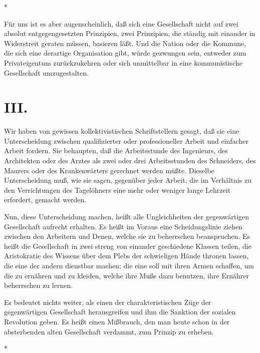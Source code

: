 \documentclass{scrbook}
\begin{document}
\begin{center}*\end{center}

Für uns ist es aber augenscheinlich, daß sich eine Gesellschaft nicht auf zwei absolut entgegengesetzten Prinzipien, zwei Prinzipien, die ständig mit einander in Widerstreit geraten müssen, basieren läßt. Und die Nation oder die Kommune, die sich eine derartige Organisation gibt, würde gezwungen sein, entweder zum Privateigentum zurückzukehren oder sich unmittelbar in eine kommunistische Gesellschaft umzugestalten.

\section*{III.}

Wir haben von gewissen kollektivistischen Schriftstellern gesagt, daß sie eine Unterscheidung zwischen qualifizierter oder professioneller Arbeit und einfacher Arbeit fordern. Sie behaupten, daß die Arbeitsstunde des Ingenieurs, des Architekten oder des Arztes als zwei oder drei Arbeitsstunden des Schneiders, des Maurers oder des Krankenwärters gerechnet werden müßte. Dieselbe Unterscheidung muß, wie sie sagen, gegenüber jeder Arbeit, die im Verhältnis zu den Verrichtungen des Tagelöhners eine mehr oder weniger lange Lehrzeit erfordert, gemacht werden.

Nun, diese Unterscheidung machen, heißt alle Ungleichheiten der gegenwärtigen Gesellschaft aufrecht erhalten. Es heißt im Voraus eine Scheidungslinie ziehen zwischen den Arbeitern und Denen, welche sie zu beherrschen beanspruchen. Es heißt die Gesellschaft in zwei streng von einander geschiedene Klassen teilen, die Aristokratie des Wissens über dem Plebs der schwieligen Hände thronen lassen, die eine der andern dienstbar machen; die eine soll mit ihren Armen schaffen, um die zu ernähren und zu kleiden, welche ihre Muße dazu benutzen, ihre Ernährer beherrschen zu lernen.

Es bedeutet nichts weiter, als einen der charakteristischen Züge der gegenwärtigen Gesellschaft herausgreifen und ihm die Sanktion der sozialen Revolution geben. Es heißt einen Mißbrauch, den man heute schon in der absterbenden alten Gesellschaft verdammt, zum Prinzip zu erheben.

\begin{center}*\end{center}
\end{document}
